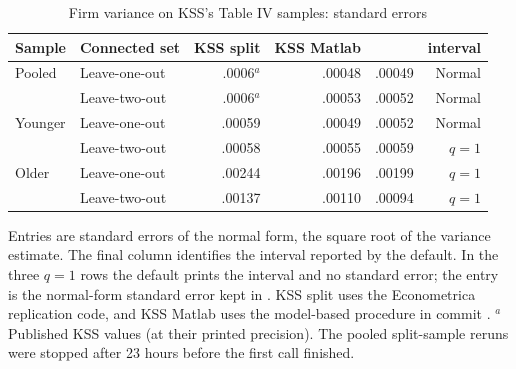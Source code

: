 \begin{table}[htbp]\centering
\caption{Firm variance on KSS's Table IV samples: standard errors}\label{tab:six}
\small\begin{tabular}{@{}llrrrr@{}}
\toprule
Sample & Connected set & KSS split & KSS Matlab & \fevc{} & \fevc{} interval\\
\midrule
Pooled & Leave-one-out & .0006$^a$ & .00048 & .00049 & Normal\\
       & Leave-two-out & .0006$^a$ & .00053 & .00052 & Normal\\
Younger & Leave-one-out & .00059 & .00049 & .00052 & Normal\\
        & Leave-two-out & .00058 & .00055 & .00059 & $q=1$\\
Older  & Leave-one-out & .00244 & .00196 & .00199 & $q=1$\\
       & Leave-two-out & .00137 & .00110 & .00094 & $q=1$\\
\bottomrule
\end{tabular}
\par\smallskip\begin{minipage}{0.92\linewidth}\footnotesize
Entries are standard errors of the normal form, the square root of the variance
estimate. The final column identifies the interval reported by the \fevc{} default. In
the three $q=1$ rows the default prints the interval and no standard error; the entry
is the normal-form standard error kept in . KSS split
uses the Econometrica replication code, and KSS Matlab uses the model-based procedure
in commit . $^a$Published KSS values (at their printed precision).
The pooled split-sample reruns were stopped after 23 hours before the first
call finished.
\end{minipage}
\end{table}

